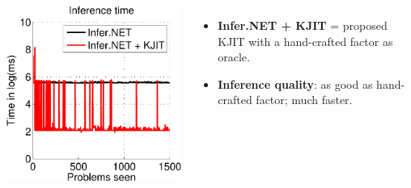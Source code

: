 \documentclass[25pt, a0paper, portrait, margin=0mm, innermargin=10mm,
     blockverticalspace=7mm, colspace=8mm, subcolspace=8mm]{tikzposter} %
\begin{document}
\begin{columns}
{\begin{tikzfigure}
  \hspace{1.8cm}
  \includegraphics[width=11.2cm]{online/cg_inference_time-crop}
\end{tikzfigure}


\begin{itemize}
    \item \textbf{Infer.NET + KJIT} = proposed KJIT with a hand-crafted factor as oracle.
    \item \textbf{Inference quality}: as good as hand-crafted factor; much faster.
\end{itemize}

} %



\end{columns}
\end{document}
